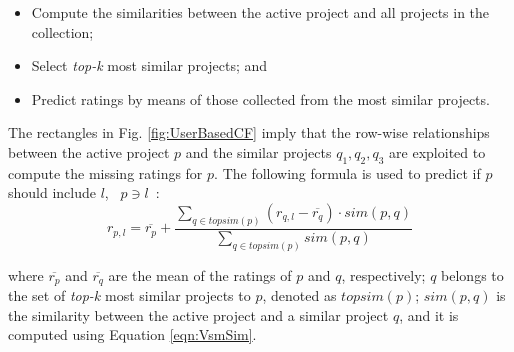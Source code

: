 
\begin{itemize} 	
	\item Compute the similarities between the active project and all projects in the collection;
	\item Select \emph{top-k} most similar projects; and %
	\item Predict ratings by means of those collected from the most similar projects.
\end{itemize} 

The rectangles in Fig. \ref{fig:UserBasedCF} imply that the row-wise relationships between the active project $p$ and the similar projects $q_1,q_2,q_3$ are exploited to compute the missing ratings for $p$. The following formula is used to predict if $p$ should include $l$, \ie~$p \ni l$~\cite{DBLP:conf/rweb/NoiaO15}: %
\begin{equation} \label{eqn:Prediction}
r_{p,l}=\overline{r_{p}}+\frac{\sum_{q \in topsim(p)}(r_{q,l}-\overline{r_{q}})\cdot sim(p,q) }{\sum_{q \in topsim(p)} sim(p,q) }  %
\end{equation}

\noindent
where $\overline{r_{p}}$ and $\overline{r_{q}}$ are the mean of the ratings of $p$ and $q$, respectively; $q$ belongs to the set of \emph{top-k} most similar projects to $p$, denoted as $topsim(p)$; $sim(p,q)$ is the similarity between the active project and a similar project $q$, and it is computed using Equation \ref{eqn:VsmSim}. %


